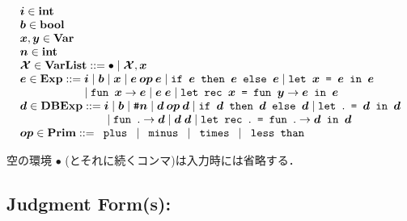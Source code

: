 \documentclass[11pt]{jarticle}
\begin{document}
\[\begin{array}{l}
\NamelessMLiiiMV{i}[] \in \mathbf{int}\\
\NamelessMLiiiMV{b}[] \in \mathbf{bool}\\
\NamelessMLiiiMV{x}[], \NamelessMLiiiMV{y}[] \in
\mathbf{Var}\\
\NamelessMLiiiMV{n}[] \in \mathbf{int}\\
\NamelessMLiiiMV{env}[] \in \mathbf{VarList} ::= \NamelessMLiiiEmptyTerm
\mid \NamelessMLiiiBindTerm{\NamelessMLiiiMV{env}[]}
{\NamelessMLiiiMV{x}[]}\\
\NamelessMLiiiMV{e}[] \in \mathbf{Exp} ::= \NamelessMLiiiMV{i}[]
\mid \NamelessMLiiiMV{b}[] \mid \NamelessMLiiiMV{x}[]
\mid \NamelessMLiiiBinOpTerm{\NamelessMLiiiMV{op}[]}{\NamelessMLiiiMV{e}[]}
{\NamelessMLiiiMV{e}[]} \mid \NamelessMLiiiIfTerm{\NamelessMLiiiMV{e}[]}
{\NamelessMLiiiMV{e}[]}{\NamelessMLiiiMV{e}[]}
\mid \NamelessMLiiiLetTerm{\NamelessMLiiiMV{x}[]}{\NamelessMLiiiMV{e}[]}
{\NamelessMLiiiMV{e}[]} \\ \hspace*{2.0cm}
\mid \NamelessMLiiiAbsTerm{\NamelessMLiiiMV{x}[]}
{\NamelessMLiiiMV{e}[]} \mid \NamelessMLiiiAppTerm{\NamelessMLiiiMV{e}[]}
{\NamelessMLiiiMV{e}[]} \mid \NamelessMLiiiLetRecTerm{\NamelessMLiiiMV{x}[]}
{\NamelessMLiiiMV{y}[]}{\NamelessMLiiiMV{e}[]}
{\NamelessMLiiiMV{e}[]}\\
\NamelessMLiiiMV{d}[] \in \mathbf{DBExp} ::= \NamelessMLiiiMV{i}[]
\mid \NamelessMLiiiMV{b}[]
\mid \NamelessMLiiiIndexTerm{\NamelessMLiiiMV{n}[]}
\mid \NamelessMLiiiBinOpDTerm{\NamelessMLiiiMV{op}[]}{\NamelessMLiiiMV{d}[]}
{\NamelessMLiiiMV{d}[]} \mid \NamelessMLiiiIfDTerm{\NamelessMLiiiMV{d}[]}
{\NamelessMLiiiMV{d}[]}{\NamelessMLiiiMV{d}[]}
\mid \NamelessMLiiiLetDTerm{\NamelessMLiiiMV{d}[]}{\NamelessMLiiiMV{d}[]}
 \\ \hspace*{2.7cm}
\mid \NamelessMLiiiAbsDTerm{\NamelessMLiiiMV{d}[]}
\mid \NamelessMLiiiAppDTerm{\NamelessMLiiiMV{d}[]}{\NamelessMLiiiMV{d}[]}
\mid \NamelessMLiiiLetRecDTerm{\NamelessMLiiiMV{d}[]}
{\NamelessMLiiiMV{d}[]}\\
\NamelessMLiiiMV{op}[] \in \mathbf{Prim} ::= \NamelessMLiiiPlusTerm
\mid \NamelessMLiiiMinusTerm \mid \NamelessMLiiiMultTerm
\mid \NamelessMLiiiLtTerm\\
\end{array}\]

空の環境 \(\bullet\) (とそれに続くコンマ)は入力時には省略する．

\subsection*{Judgment Form(s):}
\end{document}
